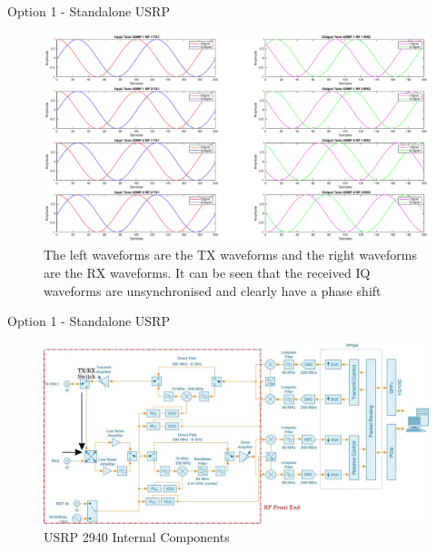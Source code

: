 \documentclass[10pt,t]{beamer}
\begin{document}
\begin{frame}{Option 1 - Standalone USRP}
    \begin{figure}[H]
        \centering
        \includegraphics[width=\linewidth]{../images/SyncIssues.eps}
        \caption{The left waveforms are the TX waveforms and the right waveforms are the RX waveforms. It can be seen that the received IQ waveforms are unsynchronised and clearly have a phase shift}
        \label{fig:SyncFail2Ch}%
    \end{figure}
\end{frame}

\begin{frame}{Option 1 - Standalone USRP}
    \begin{figure}[H]
        \centering
        \includegraphics[width=\linewidth]{../images/USRPInternalsEdited.jpeg}
        \caption{USRP 2940 Internal Components}%
        \label{fig:USRPInternals}%
    \end{figure}
\end{frame}
\end{document}
